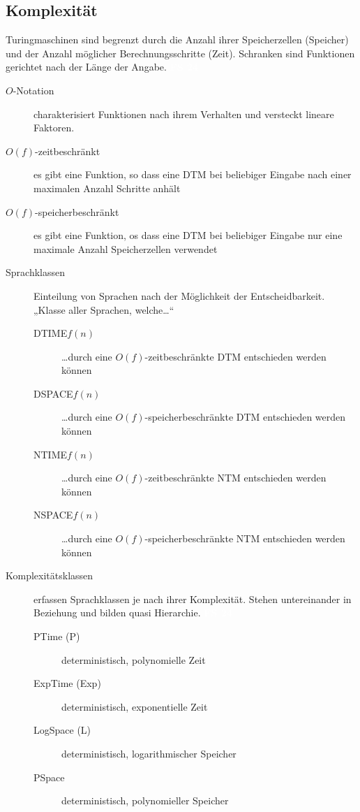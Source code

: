 \documentclass[a4paper,10pt]{article}
\newcommand{\vl}[1]{\colorbox{vl}{\textcolor{white}{\small\textbf{#1}}}}
\begin{document}
    \newpage
    \subsection{Komplexität}
    \label{subsec:fs-komplexitaet}
    Turingmaschinen sind begrenzt durch die Anzahl ihrer Speicherzellen (Speicher) und der Anzahl möglicher Berechnungsschritte (Zeit).
    Schranken sind Funktionen gerichtet nach der Länge der Angabe. \vl{FS 24}

    \begin{description}
        \item[$O$-Notation] charakterisiert Funktionen nach ihrem Verhalten und versteckt lineare Faktoren.
        \item[$O(f)$-zeitbeschränkt] es gibt eine Funktion, so dass eine DTM bei beliebiger Eingabe nach einer maximalen Anzahl Schritte anhält
        \item[$O(f)$-speicherbeschränkt] es gibt eine Funktion, os dass eine DTM bei beliebiger Eingabe nur eine maximale Anzahl Speicherzellen verwendet

        \item[Sprachklassen] Einteilung von Sprachen nach der Möglichkeit der Entscheidbarkeit. \\
            „Klasse aller Sprachen, welche…“
            \begin{description}
                \item[DTIME$f(n)$] …durch eine $O(f)$-zeitbeschränkte DTM entschieden werden können
                \item[DSPACE$f(n)$] …durch eine $O(f)$-speicherbeschränkte DTM entschieden werden können

                \item[NTIME$f(n)$] …durch eine $O(f)$-zeitbeschränkte NTM entschieden werden können
                \item[NSPACE$f(n)$] …durch eine $O(f)$-speicherbeschränkte NTM entschieden werden können
            \end{description}

        \item[Komplexitätsklassen] erfassen Sprachklassen je nach ihrer Komplexität.
            Stehen untereinander in Beziehung und bilden quasi Hierarchie. \vl{FS 24}
            \begin{description}
                \item[PTime (P)] deterministisch, polynomielle Zeit
                \item[ExpTime (Exp)] deterministisch, exponentielle Zeit
                \item[LogSpace (L)] deterministisch, logarithmischer Speicher
                \item[PSpace] deterministisch, polynomieller Speicher


\end{description}
\end{description}
\end{document}
